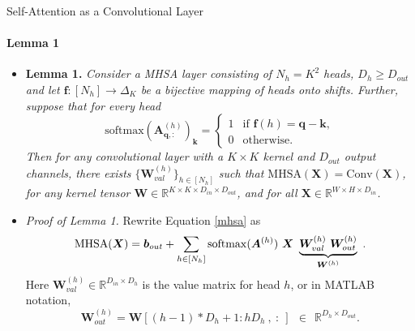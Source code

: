 \documentclass[9pt]{beamer}
\newcommand{\bb}{\mathbb}
\newcommand{\mb}{\bm}
\begin{document}
\begin{frame}{Self-Attention as a Convolutional Layer}
\framesubtitle{Lemma 1}
\begin{itemize}
\item \textbf{Lemma 1.} {\em Consider a MHSA layer consisting of $N_h = K^2$ heads, $D_h\geq D_{out}$ and let $\bm f:[N_h]\rightarrow\Delta_K$ be a bijective mapping of heads onto shifts. Further, suppose that for every head
\begin{equation}
\mathrm{softmax}(\mb A^{(h)}_{\mb q,:})_{\mb k} = \begin{cases}
    1 & \text{if } \mb f(h) = \mb q - \mb k,
    \\ 0 & \text{otherwise}.
    \end{cases} \label{lemma1_assumption}
\end{equation}
Then for any convolutional layer with a $K\times K$ kernel and $D_{out}$ output channels, there exists $\{\bm W_{val}^{(h)}\}_{h\in[N_h]}$ such that $\mathrm{MHSA}(\bm X) = \mathrm{Conv}(\bm X)$, for any kernel tensor $\bm W \in \bb R^{K\times K \times D_{in} \times D_{out}}$, and for all $\bm X\in\bb R^{W\times H\times D_{in}}$.}

\vspace{.05in}
\item \textit{Proof of Lemma 1.} Rewrite Equation \eqref{mhsa} as
\begin{equation}
    \mathrm{MHSA}(\mb X) = \mb b_{out} + 
        \sum_{h\in[N_h]} \mathrm{softmax}(\mb A^{(h)})\ \mb X\ 
        \underbrace{\mb W_{val}^{(h)}\ \mb W_{out}^{(h)}}_{\mb W^{(h)}}\ .
    \vspace{-.1in}
\end{equation}
Here $\bm W_{val}^{(h)} \in \bb R^{D_{in}\times D_h}$ is the value matrix for head $h$, or in MATLAB notation,
$$\bm W_{out}^{(h)} = \bm W[(h-1)*D_h+1 : hD_h\ , \ :\ ] \ \ \in\ \ \bb R^{D_h\times D_{out}}.$$
\end{itemize}
\end{frame}
\end{document}
